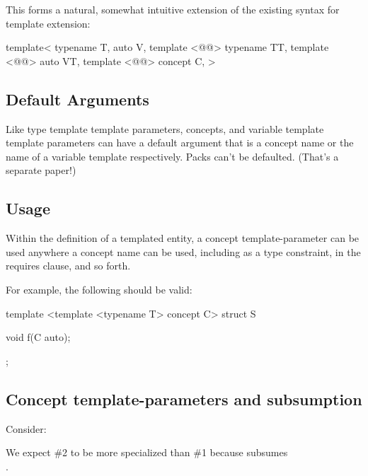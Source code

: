 \documentclass{wg21}
\begin{document}
This forms a natural, somewhat intuitive extension of the existing syntax for template extension:
\begin{colorblock}
template<
    typename T,
    auto V,
    template <@@> typename TT,
    template <@@> auto VT,
    template <@@> concept C,
>
\end{colorblock}

\subsection{Default Arguments}

Like type template template parameters, concepts, and variable template template
parameters can have a default argument that is a concept name or the name of a variable template respectively.
Packs can't be defaulted. (That's a separate paper!)

\subsection{Usage}

Within the definition of a templated entity, a concept template-parameter
can be used anywhere a concept name can be used, including as a type constraint, in the requires clause, and so forth.

For example, the following should be valid:

\begin{colorblock}
template <template <typename T> concept C>
struct S {
    void f(C auto);

};
\end{colorblock}

\subsection{Concept template-parameters and subsumption}

Consider:

We expect \#2 to be more specialized than \#1 because  subsumes\\
.
\end{document}
